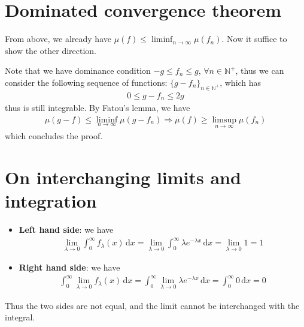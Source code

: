 \documentclass[11pt,a4paper]{article}
\numberwithin{equation}{section}%
\begin{document}
\section{Dominated convergence theorem}

From above, we already have $ \mu (f) \leq \liminf_{n\to\infty} \mu (f_n) $. Now it suffice to show the other direction.

Note that we have dominance condition $ -g \leq f_n \leq g $, $ \forall n\in \mathbb{N}^+ $, thus we can consider the following sequence of functions: $ \{ g-f_n \}_{n\in\mathbb{N}^+} $, which has
\begin{align*}
    0\leq g-f_n \leq 2g 
\end{align*}
thus is still integrable. By Fatou's lemma, we have
\begin{align*}
    \mu (g-f) \leq \liminf_{n\to\infty} \mu (g-f_n)  \Rightarrow \mu (f) \geq \limsup_{n\to\infty} \mu (f_n)
\end{align*}
which concludes the proof.

\section{On interchanging limits and integration}

\begin{itemize}[topsep=2pt,itemsep=0pt]
    \item \textbf{Left hand side}: we have
    \begin{align*}
        \lim_{\lambda \to 0 }\int_0^\infty f_\lambda (x)\,\mathrm{d}x = \lim_{\lambda \to 0 }\int_0^\infty \lambda e^{-\lambda x}\,\mathrm{d}x = \lim_{\lambda \to 0 }1 = 1 
    \end{align*}
    \item \textbf{Right hand side}: we have
    \begin{align*}
        \int_0^\infty \lim_{\lambda \to 0 }f_\lambda (x)\,\mathrm{d}x = \int_0^\infty \lim_{\lambda \to 0 }\lambda e^{-\lambda x}\,\mathrm{d}x = \int_0^\infty 0\,\mathrm{d}x = 0 
    \end{align*}
\end{itemize}

Thus the two sides are not equal, and the limit cannot be interchanged with the integral. 
\end{document}
